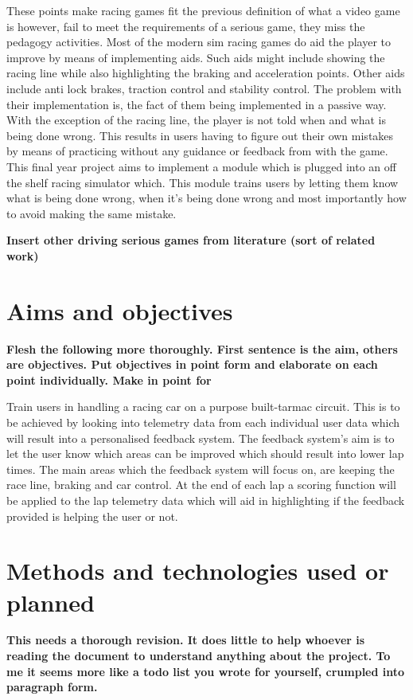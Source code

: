 \documentclass{article}
\begin{document}
These points make racing games fit the previous definition of what a video game is however, fail to meet the requirements of a serious game, they miss the pedagogy activities. Most of the modern sim racing games do aid the player to improve by means of implementing aids. Such aids might include showing the racing line while also highlighting the braking and acceleration points. Other aids include anti lock brakes, traction control and stability control. The problem with their implementation is, the fact of them being implemented in a passive way. With the exception of the racing line, the player is not told when and what is being done wrong. This results in users having to figure out their own mistakes by means of practicing without any guidance or feedback from with the game. This final year project aims to implement a module which is plugged into an off the shelf racing simulator which. This module trains users by letting them know what is being done wrong, when it's being done wrong and most importantly how to avoid making the same mistake.

\textbf{Insert other driving serious games from literature (sort of related work)}

\section{Aims and objectives}

\textbf{Flesh the following more thoroughly. First sentence is the aim, others are objectives. Put objectives in point form and elaborate on each point individually. Make in point for } 

Train users in handling a racing car on a purpose built-tarmac circuit. This is to be achieved by looking into telemetry data from each individual user data which will result into a personalised feedback system. The feedback system’s aim is to let the user know which areas can be improved which should result into lower lap times. The main areas which the feedback system will focus on, are keeping the race line, braking and car control. At the end of each lap a scoring function will be applied to the lap telemetry data which will aid in highlighting if the feedback provided is helping the user or not.

\section{Methods and technologies used or planned}

\textbf{This needs a thorough revision. It does little to help whoever is reading the document to understand anything about the project. To me it seems more like a todo list you wrote for yourself, crumpled into paragraph form.}
\end{document}
